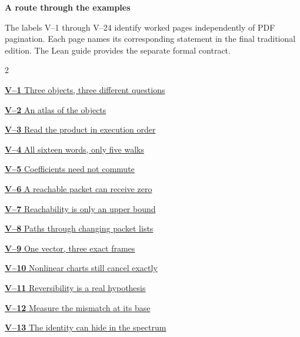 \documentclass[11pt,a4paper]{article}
\begin{document}
\KomorebiCover
{}


{\sffamily\bfseries\Large\color{accent}A route through the examples}\par\medskip
The labels V--1 through V--24 identify worked pages independently of PDF
pagination. Each page names its corresponding statement in the final
traditional edition. The Lean guide provides the separate formal contract.
\medskip
\begin{multicols}{2}
{\small\noindent\hyperlink{vpage1}{\textbf{V--1} Three objects, three different questions}\par\smallskip}
{\small\noindent\hyperlink{vpage2}{\textbf{V--2} An atlas of the objects}\par\smallskip}
{\small\noindent\hyperlink{vpage3}{\textbf{V--3} Read the product in execution order}\par\smallskip}
{\small\noindent\hyperlink{vpage4}{\textbf{V--4} All sixteen words, only five walks}\par\smallskip}
{\small\noindent\hyperlink{vpage5}{\textbf{V--5} Coefficients need not commute}\par\smallskip}
{\small\noindent\hyperlink{vpage6}{\textbf{V--6} A reachable packet can receive zero}\par\smallskip}
{\small\noindent\hyperlink{vpage7}{\textbf{V--7} Reachability is only an upper bound}\par\smallskip}
{\small\noindent\hyperlink{vpage8}{\textbf{V--8} Paths through changing packet lists}\par\smallskip}
{\small\noindent\hyperlink{vpage9}{\textbf{V--9} One vector, three exact frames}\par\smallskip}
{\small\noindent\hyperlink{vpage10}{\textbf{V--10} Nonlinear charts still cancel exactly}\par\smallskip}
{\small\noindent\hyperlink{vpage11}{\textbf{V--11} Reversibility is a real hypothesis}\par\smallskip}
{\small\noindent\hyperlink{vpage12}{\textbf{V--12} Measure the mismatch at its base}\par\smallskip}
{\small\noindent\hyperlink{vpage13}{\textbf{V--13} The identity can hide in the spectrum}\par\smallskip}

\end{multicols}
\end{document}
